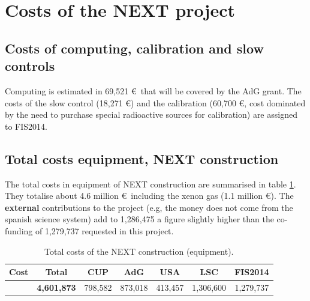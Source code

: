 \documentclass[a4paper,11pt,oneside]{article}
\begin{document}
\section{\bf Costs of the NEXT project}
\label{next.costs}





\subsection{Costs of computing, calibration and slow controls}
Computing is estimated in 69,521 \euro\ that will be covered by the AdG grant. The costs of the slow control (18,271 \euro) and the calibration (60,700 \euro, cost dominated by the need to purchase special radioactive sources for calibration) are assigned to FIS2014. 

\subsection{Total costs equipment, NEXT construction}
The total costs in equipment of NEXT construction are summarised in table  \ref{tab.TotalE}. They totalise about 4.6 million \euro\ including the xenon gas (1.1 million \euro). The {\bf external} contributions to the project (e.g, the money does not come from the spanish science system)
add to 1,286,475 a figure slightly higher than the co-funding of 1,279,737
requested in this project. 

\begin{table}[h!]
\begin{center}
\begin{tabular}{|l|c|c|c|c|c|c|}
\hline
Cost	& Total &	CUP &	AdG	& USA &	LSC &	FIS2014 \\
 \hline
& {\bf 4,601,873} &	798,582 & 	873,018 & 	413,457&	1,306,600 & 1,279,737 \\	
 \hline\hline
\end{tabular}  
\caption{Total costs of the NEXT construction (equipment).}
\label{tab.TotalE}
\end{center}
\end{table} 



\end{document}
